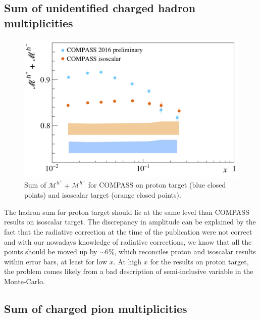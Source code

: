 \subsection{Sum of unidentified charged hadron multiplicities}

\begin{figure}[!h]
  \centering
	\includegraphics[scale=0.5]{./gfx/hs.png}
	\caption{Sum of $\mathscr{M}^{h^+}+\mathscr{M}^{h^-}$ for COMPASS on proton target (blue closed points) and isoscalar target (orange closed points).}
	\label{pic:hsum}
\end{figure}

The hadron sum for proton target should lie at the same level than COMPASS results on isoscalar target. The discrepancy in amplitude can be explained by the fact that the radiative correction at the time of the publication were not correct and with our nowadays knowledge of radiative corrections, we know that all the points should be moved up by $\sim$6\%, which reconciles proton and isoscalar results within error bars, at least for low $x$. At high $x$ for the results on proton target, the problem comes likely from a bad description of semi-inclusive variable in the Monte-Carlo.

\newpage

\subsection{Sum of charged pion multiplicities}

